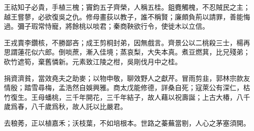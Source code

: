 \documentclass[12pt,a4paper]{ctexbook}
\begin{document}
王祜知子必貴，手植三槐；竇鈞五子齊榮，人稱五桂。鉏麑觸槐，不忍賊民之主；越王嘗蓼，必欲復吳之仇。修母畫荻以教子，誰不稱賢；廉頗負荊以請罪，善能悔過。彌子瑕常恃寵，將餘桃以啖君；秦商鞅欲行令，使徙木以立信。\par
王戎賣李鑽核，不勝鄙吝；成王剪桐封弟，因無戲言。齊景公以二桃殺三士，楊再思謂蓮花似六郎。倒啖蔗，漸入佳境；蒸哀梨，大失本真。煮豆燃萁，比兄殘弟；砍竹遮筍，棄舊憐新。元素致江陵之柑，吳剛伐月中之桂。\par
捐資濟貧，當效堯夫之助麥；以物申敬，聊效野人之獻芹。冒雨剪韭，郭林宗款友情殷；踏雪尋梅，孟浩然自娛興雅。商太戊能修德，詳桑自死；寇萊公有深仁，枯竹復生。王母蟠桃，三千年開花，三千年結子，故人藉以祝壽誕；上古大椿，八千歲爲春，八千歲爲秋，故人託以比嚴君。\par
去稂莠，正以植嘉禾；沃枝葉，不如培根本。世路之蓁蕪當剔，人心之茅塞須開。\par
\end{document}
